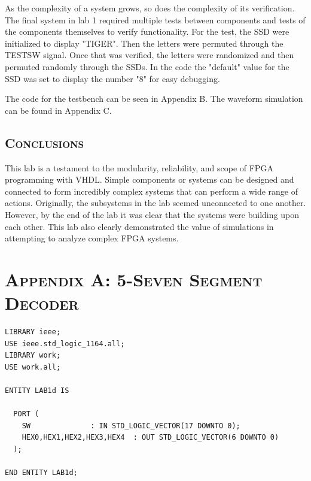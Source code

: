 \documentclass[11pt]{report}
\begin{document}
\begin{spacing}{1.5}
As the complexity of a system grows, so does the complexity of its verification.  The final system in lab 1 required multiple tests between components and tests of the components themselves to verify functionality.  For the test, the SSD were initialized to display "TIGER".  Then the letters were permuted through the TESTSW signal.  Once that was verified, the letters were randomized and then permuted randomly through the SSDs.  In the code the "default" value for the SSD was set to display the number "8" for easy debugging.

The code for the testbench can be seen in Appendix B.  The waveform simulation can be found in Appendix C.

\section{\scshape Conclusions} %
\label{sec:conclusions}

This lab is a testament to the modularity, reliability, and scope of FPGA programming with VHDL.  Simple components or systems can be designed and connected to form incredibly complex systems that can perform a wide range of actions.  Originally, the subsystems in the lab seemed unconnected to one another.  However, by the end of the lab it was clear that the systems were building upon each other.  This lab also clearly demonstrated the value of simulations in attempting to analyze complex FPGA systems.



\clearpage

{}

\clearpage

\chapter*{\scshape Appendix A: 5-Seven Segment Decoder}
\label{app:a}

\vspace{45px}
\begin{lstlisting}
LIBRARY ieee;
USE ieee.std_logic_1164.all;
LIBRARY work;
USE work.all;

ENTITY LAB1d IS

  PORT (
    SW              : IN STD_LOGIC_VECTOR(17 DOWNTO 0);
    HEX0,HEX1,HEX2,HEX3,HEX4  : OUT STD_LOGIC_VECTOR(6 DOWNTO 0)
  );
      
END ENTITY LAB1d;


\end{lstlisting}
\end{spacing}
\end{document}
